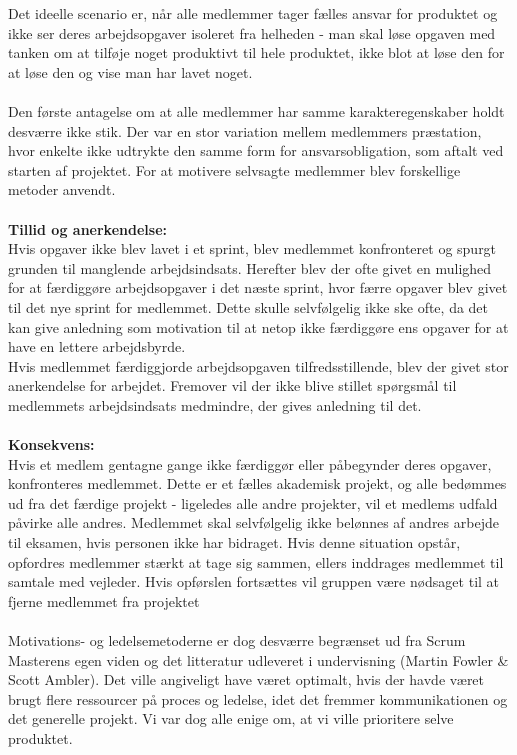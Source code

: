 \documentclass[a4paper,12pt,fleqn,oneside]{article}
\begin{document}
Det ideelle scenario er, når alle medlemmer tager fælles ansvar for produktet og ikke ser deres arbejdsopgaver isoleret fra helheden - man skal løse opgaven med tanken om at tilføje noget produktivt til hele produktet, ikke blot at løse den for at løse den og vise man har lavet noget. \\\\
Den første antagelse om at alle medlemmer har samme karakteregenskaber holdt desværre ikke stik. Der var en stor variation mellem medlemmers præstation, hvor enkelte ikke udtrykte den samme form for ansvarsobligation, som aftalt ved starten af projektet. For at motivere selvsagte medlemmer blev forskellige metoder anvendt. \\\\
\textbf{Tillid og anerkendelse:}\\
Hvis opgaver ikke blev lavet i et sprint, blev medlemmet konfronteret og spurgt grunden til manglende arbejdsindsats. Herefter blev der ofte givet en mulighed for at færdiggøre arbejdsopgaver i det næste sprint, hvor færre opgaver blev givet til det nye sprint for medlemmet.  Dette skulle selvfølgelig ikke ske ofte, da det kan give anledning som motivation til at netop ikke færdiggøre ens opgaver for at have en lettere arbejdsbyrde. \\
Hvis medlemmet færdiggjorde arbejdsopgaven tilfredsstillende, blev der givet stor anerkendelse for arbejdet. Fremover vil der ikke blive stillet spørgsmål til medlemmets arbejdsindsats medmindre, der gives anledning til det. \\\\
\textbf{Konsekvens:}\\
Hvis et medlem gentagne gange ikke færdiggør eller påbegynder deres opgaver, konfronteres medlemmet. Dette er et fælles akademisk projekt, og alle bedømmes ud fra det færdige projekt - ligeledes alle andre projekter, vil et medlems udfald påvirke alle andres. Medlemmet skal selvfølgelig ikke belønnes af andres arbejde til eksamen, hvis personen ikke har bidraget. Hvis denne situation opstår, opfordres medlemmer stærkt at tage sig sammen, ellers inddrages medlemmet til samtale med vejleder. Hvis opførslen fortsættes vil gruppen være nødsaget til at fjerne medlemmet fra projektet \\\\
Motivations- og ledelsemetoderne er dog desværre begrænset ud fra Scrum Masterens egen viden og det litteratur udleveret i undervisning (Martin Fowler \& Scott Ambler). Det ville angiveligt have været optimalt, hvis der havde været brugt flere ressourcer på proces og ledelse, idet det fremmer kommunikationen og det generelle projekt. Vi var dog alle enige om, at vi ville prioritere selve produktet. 
\end{document}
